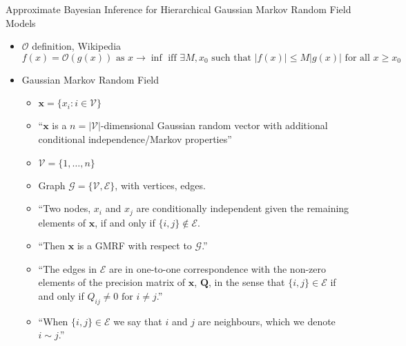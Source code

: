 \documentclass{article}
\begin{document}
Approximate Bayesian Inference for Hierarchical Gaussian Markov Random Field Models \citep{Rue2007}
\begin{itemize}
\item $\mathcal{O}$ definition, Wikipedia
$$f(x) = \mathcal{O}(g(x)) \text{ as } x \rightarrow \inf \text{ iff } \exists M, x_{0} \text{ such that } |f(x)| \leq M|g(x)| \text{ for all } x \geq x_{0}$$
\item Gaussian Markov Random Field 
   \begin{itemize}
   \item $\pmb{x} = \{ x_{i}:i \in \mathscr{V} \}$
   \item ``$\pmb{x}$ is a $n = |\mathscr{V}|$-dimensional Gaussian random vector with additional conditional independence/Markov properties''
   \item $\mathscr{V} = \{1,\dots,n\}$
   \item Graph $\mathscr{G} = \{ \mathscr{V}, \mathscr{E} \}$, with vertices, edges.
   \item ``Two nodes, $x_{i}$ and $x_{j}$ are conditionally independent given the remaining elements of $\pmb{x}$, if and only if $\{i, j\} \notin \mathscr{E}$.
   \item ``Then $\pmb{x}$ is a GMRF with respect to $\mathscr{G}$.''
   \item ``The edges in $\mathscr{E}$ are in one-to-one correspondence with the non-zero elements of the precision matrix of $\pmb{x}$, $\pmb{Q}$, in the sense that $\{ i, j \} \in \mathscr{E}$ if and only if $Q_{ij} \neq 0 \text{ for } i \neq j$.''
   \item ``When $\{i,j\} \in \mathscr{E}$ we say that $i$ and $j$ are neighbours, which we denote $i \sim j$.''
   \end{itemize}


\end{itemize}
\end{document}
